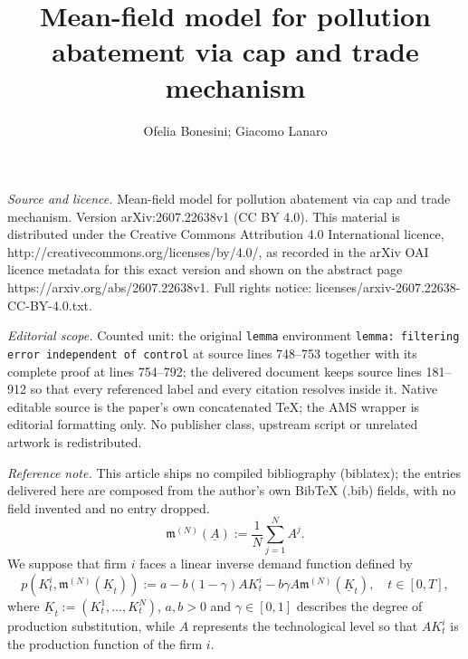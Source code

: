 \documentclass[10pt,a4paper]{amsart}
\numberwithin{equation}{section}
\begin{document}
\title[Mean-field model for pollution abatement via cap and trade m]{Mean-field model for pollution abatement via cap and trade mechanism}
\author{Ofelia Bonesini; Giacomo Lanaro}
\date{}
\maketitle
\noindent\emph{Source and licence.} Mean-field model for pollution abatement via cap and trade mechanism. Version arXiv:2607.22638v1 (CC BY 4.0). This material is distributed under the Creative Commons Attribution 4.0 International licence, http://creativecommons.org/licenses/by/4.0/, as recorded in the arXiv OAI licence metadata for this exact version and shown on the abstract page https://arxiv.org/abs/2607.22638v1. Full rights notice: licenses/arxiv-2607.22638-CC-BY-4.0.txt.\par\smallskip
\noindent\textit{Editorial scope.} Counted unit: the original \texttt{lemma} environment \texttt{lemma: filtering error independent of control} at source lines 748--753 together with its complete proof at lines 754--792; the delivered document keeps source lines 181--912 so that every referenced label and every citation resolves inside it. Native editable source is the paper's own concatenated TeX; the AMS wrapper is editorial formatting only. No publisher class, upstream script or unrelated artwork is redistributed.
\par\smallskip\noindent\textit{Reference note.} This article ships no compiled bibliography (biblatex); the entries delivered here are composed from the author's own BibTeX (.bib) fields, with no field invented and no entry dropped.
\begin{equation}
\label{eqn: empirical mean notation}
\mathfrak{m}^{(N)}(\underline{A}) := \frac{1}{N} \sum_{j = 1}^N A^j.
\end{equation}
We suppose that firm $i$ faces a linear inverse demand function defined by
\begin{equation}
\label{eqn: price good economy n}
p(K^i_t,\mathfrak{m}^{(N)}(\underline{K}_t)):= a- b(1-\gamma) AK^i_t - b\gamma A\mathfrak{m}^{(N)}(\underline{K}_t),\quad t\in[0,T],
\end{equation}
where $\underline{K}_t:= (K^1_t,\dots, K^N_t)$, $a,b>0$ and $\gamma \in[0,1]$ describes the degree of production substitution, while $A$ represents the technological level so that $AK^i_t$ is the production function of the firm $i$.
\end{document}
